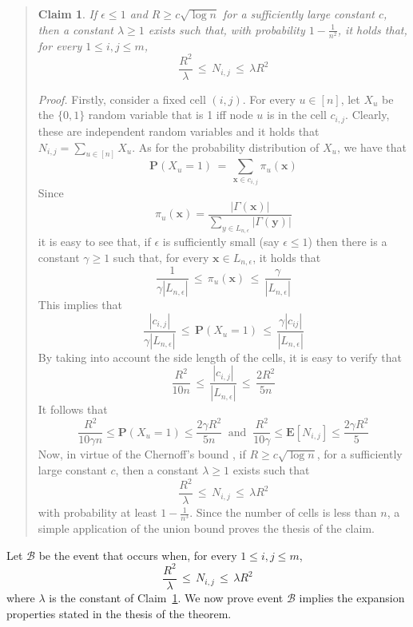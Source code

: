\documentclass[10pt,a4paper]{article}
\newtheorem{claim}{Claim}
\newcommand{\Prob}[1]{\mathbf{P} \left( #1 \right)}
\newcommand{\Expec}[1]{\mathbf{E} \left[ #1 \right]}
\newcommand{\proof}{\noindent\textit{Proof. }}
\newcommand{\qed}{\hspace{\stretch{1}$\square$}}
\begin{document}
\begin{quote}
\begin{claim}\label{claim:density}
If $\epsilon \leqslant 1$ and $R \geqslant c\sqrt{\log n}$ for a sufficiently large constant $c$, then a constant $\lambda \geqslant 1$ exists such that, with probability $1 - \frac{1}{n^2}$, it holds that, for every $1\leqslant i, j\leqslant m$,
$$
\frac{R^2}{\lambda} \, \leqslant \, N_{i,j} \, \leqslant \, \lambda R^2
$$
\end{claim}
\proof Firstly, consider a fixed cell $(i,j)$. For every $u \in [n]$, let $X_u$ be the $\{0,1\}$
random variable that is 1 iff node $u$ is in the cell $c_{i,j}$. Clearly, these are independent random
variables and it holds that $N_{i,j} = \sum_{u\in [n]} X_u$. As for the probability distribution of
$X_u$, we have that
\[
\Prob{X_u = 1} \, = \, \sum_{\mathbf{x}\in c_{i,j}} \pi_u(\mathbf{x})
\]
Since
\[
\pi_u(\mathbf{x}) = \frac{|\Gamma(\mathbf{x})|}{\sum_{y\in L_{n,\epsilon}}|\Gamma(\mathbf{y})|}
\]
it is easy to see that, if $\epsilon$ is sufficiently small (say $\epsilon\leqslant 1$) then there is a constant $\gamma \geqslant 1$ such that, for every $\mathbf{x} \in L_{n,\epsilon}$, it holds that
\[
\frac{1}{\gamma |L_{n,\epsilon}|} \,\leqslant\, \pi_u(\mathbf{x}) \, \leqslant \,
\frac{\gamma}{|L_{n,\epsilon}|}
\]
This implies that
\[
\frac{|c_{i,j}|}{\gamma |L_{n,\epsilon}|} \, \leqslant \, \Prob{X_u = 1}\, \leqslant \, \frac{\gamma |c_{ij}|}{|L_{n,\epsilon}|}
\]
By taking into account the side length of the cells, it is easy to verify that 
\[
\frac{R^2}{10n}\, \leqslant \, \frac{|c_{i,j}|}{|L_{n,\epsilon}|} \, \leqslant\, \frac{2 R^2}{5n}
\]
It follows that
\[
\frac{R^2}{10\gamma n}   \leqslant \Prob{X_u = 1} \leqslant \frac{2\gamma R^2}{5n}
\ \mbox{ and } \
\frac{R^2}{10\gamma} \leqslant \Expec{N_{i,j}} \leqslant \frac{2\gamma R^2}{5}
\]
Now, in virtue of the Chernoff's bound \cite{ALICE}, if $R \geqslant c\sqrt{\log n}$, for a sufficiently large
constant $c$, then a constant $\lambda \geqslant 1$ exists such that
\[
\frac{R^2}{\lambda} \, \leqslant\, N_{i,j} \, \leqslant \,  \lambda R^2
\]
with probability at least $1 - \frac{1}{n^3}$. Since the number of cells is less than $n$, a simple
application of the union bound proves the thesis of the claim.
\qed
\end{quote}

\noindent Let $\mathcal{B}$ be the event that occurs when, for every $1\leqslant i, j\leqslant m$,
$$
\frac{R^2}{\lambda} \, \leqslant \, N_{i,j} \, \leqslant\, \lambda R^2
$$
where $\lambda$ is the constant of Claim~\ref{claim:density}. We now prove event $\mathcal{B}$ implies
the expansion properties stated in the thesis of the theorem.
\end{document}
